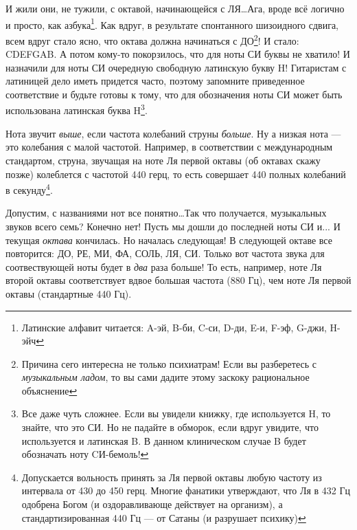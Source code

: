 И жили они, не тужили, с октавой, начинающейся с ЛЯ\ldots Ага, вроде всё логично и просто, как азбука\footnote{Латинские алфавит читается: A-эй, B-би, C-си, D-ди, E-и, F-эф, G-джи, H-эйч}. Как вдруг, в результате спонтанного шизоидного сдвига, всем вдруг стало ясно, что октава должна начинаться с ДО\footnote{Причина сего интересна не только психиатрам! Если вы разберетесь с \emph{музыкальным ладом}, то вы сами дадите этому заскоку рациональное объяснение}! И стало: CDEFGAB. А потом кому-то покорзилось, что для ноты СИ буквы не хватило! И назначили для ноты СИ очередную свободную латинскую букву H! Гитаристам с латиницей дело иметь придется часто, поэтому запомните приведенное соответствие и будьте готовы к тому, что для обозначения ноты СИ может быть использована латинская буква H\footnote{Все даже чуть сложнее. Если вы увидели книжку, где используется H, то знайте, что это СИ. Но не падайте в обморок, если вдруг увидите, что используется и латинская B. В данном клиническом случае B будет обозначать ноту CИ-бемоль!}.

Нота звучит \emph{выше}, если частота колебаний струны \emph{больше}. Ну а низкая нота --- это колебания с малой частотой. Например, в соответствии с международным стандартом, струна, звучащая на ноте Ля первой октавы (об октавах скажу позже) колеблется с частотой 440 герц, то есть совершает 440 полных колебаний в секунду\footnote{Допускается вольность принять за Ля первой октавы любую частоту из интервала от 430 до 450 герц. Многие фанатики утверждают, что Ля в 432 Гц одобрена Богом (и оздоравливающе действует на организм), а стандартизированная 440 Гц --- от Сатаны (и разрушает психику)}.

Допустим, с названиями нот все понятно\ldots Так что получается, музыкальных звуков всего семь? Конечно нет! Пусть мы дошли до последней ноты СИ и... И текущая \emph{октава} кончилась. Но началась следующая! В следующей октаве все повторится: ДО, РЕ, МИ, ФА, СОЛЬ, ЛЯ, СИ. Только вот частота звука для соотвествующей ноты будет в \emph{два} раза больше! То есть, например, ноте Ля второй октавы соответствует вдвое большая частота (880 Гц), чем ноте Ля первой октавы (стандартные 440 Гц).

